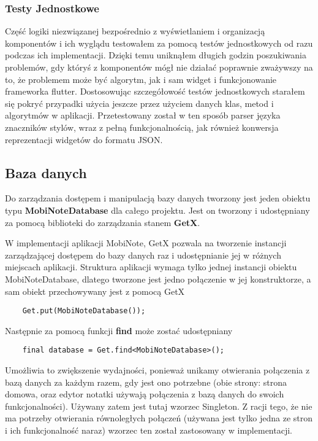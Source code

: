 \subsubsection{Testy Jednostkowe}

Część logiki niezwiązanej bezpośrednio z wyświetlaniem i organizacją komponentów i ich wyglądu testowałem za pomocą testów jednostkowych od razu podczas ich implementacji. Dzięki temu uniknąłem długich godzin poszukiwania problemów, gdy któryś z komponentów mógł nie działać poprawnie zważywszy na to, że problemem może być algorytm, jak i sam widget i funkcjonowanie frameworka flutter. Dostosowując szczegółowość testów jednostkowych starałem się pokryć przypadki użycia jeszcze przez użyciem danych klas, metod i algorytmów w aplikacji. Przetestowany został w ten sposób parser języka znaczników stylów, wraz z pełną funkcjonalnością, jak również konwersja reprezentacji widgetów do formatu JSON.

\subsection{Baza danych}

Do zarządzania dostępem i manipulacją bazy danych tworzony jest jeden obiektu typu \textbf{MobiNoteDatabase} dla całego projektu. Jest on tworzony i udostępniany za pomocą biblioteki do zarządzania stanem \textbf{GetX}. 

W implementacji aplikacji MobiNote, GetX pozwala na tworzenie instancji zarządzającej dostępem do bazy danych raz i udostępnianie jej w różnych miejscach aplikacji. Struktura aplikacji wymaga tylko jednej instancji obiektu MobiNoteDatabase, dlatego tworzone jest jedno połączenie w jej konstruktorze, a sam obiekt przechowywany jest z pomocą GetX

\begin{verbatim}
    Get.put(MobiNoteDatabase());
\end{verbatim}

\noindent Następnie za pomocą funkcji \textbf{find} może zostać udostępniany

\begin{verbatim}
    final database = Get.find<MobiNoteDatabase>();
\end{verbatim}

Umożliwia to zwiększenie wydajności, ponieważ unikamy otwierania połączenia z bazą danych za każdym razem, gdy jest ono potrzebne (obie strony: strona domowa, oraz edytor notatki używają połączenia z bazą danych do swoich funkcjonalności). Używany zatem jest tutaj wzorzec Singleton. Z racji tego, że nie ma potrzeby otwierania równoległych połączeń (używana jest tylko jedna ze stron i ich funkcjonalność naraz) wzorzec ten został zastosowany w implementacji.

